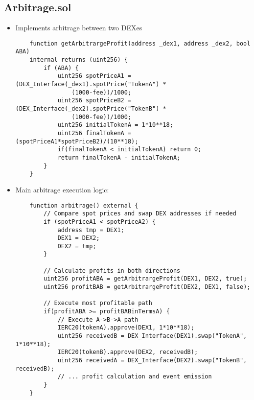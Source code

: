 \documentclass[12pt,a4paper]{article}
\begin{document}
\subsection*{Arbitrage.sol}
\begin{itemize}
    \item Implements arbitrage between two DEXes
    \begin{listing}[H]
    \begin{verbatim}
    function getArbitrargeProfit(address _dex1, address _dex2, bool ABA) 
    internal returns (uint256) {
        if (ABA) {
            uint256 spotPriceA1 = (DEX_Interface(_dex1).spotPrice("TokenA") * 
                (1000-fee))/1000;
            uint256 spotPriceB2 = (DEX_Interface(_dex2).spotPrice("TokenB") * 
                (1000-fee))/1000;
            uint256 initialTokenA = 1*10**18;
            uint256 finalTokenA = (spotPriceA1*spotPriceB2)/(10**18);
            if(finalTokenA < initialTokenA) return 0;
            return finalTokenA - initialTokenA;
        }
    }
    \end{verbatim}
    \end{listing}

    \item Main arbitrage execution logic:
    \begin{listing}[H]
    \begin{verbatim}
    function arbitrage() external {
        // Compare spot prices and swap DEX addresses if needed
        if (spotPriceA1 < spotPriceA2) {
            address tmp = DEX1;
            DEX1 = DEX2;
            DEX2 = tmp;
        }
        
        // Calculate profits in both directions
        uint256 profitABA = getArbitrargeProfit(DEX1, DEX2, true);
        uint256 profitBAB = getArbitrargeProfit(DEX2, DEX1, false);
        
        // Execute most profitable path
        if(profitABA >= profitBABinTermsA) {
            // Execute A->B->A path
            IERC20(tokenA).approve(DEX1, 1*10**18);
            uint256 receivedB = DEX_Interface(DEX1).swap("TokenA", 1*10**18);
            IERC20(tokenB).approve(DEX2, receivedB);
            uint256 receivedA = DEX_Interface(DEX2).swap("TokenB", receivedB);
            // ... profit calculation and event emission
        }
    }
    \end{verbatim}
    \end{listing}
\end{itemize}
\end{document}
